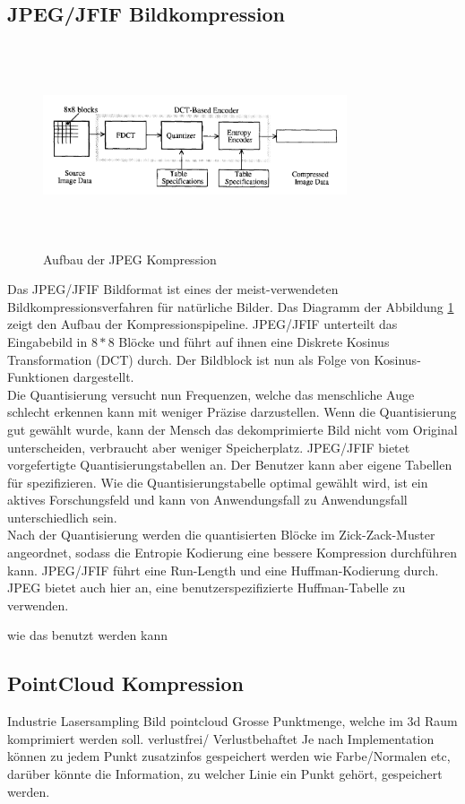 \subsection{JPEG/JFIF Bildkompression}
\begin{figure}[!htbp]
	\center
	\includegraphics[width=0.8\textwidth,height=6cm,keepaspectratio]{./pictures/state/jpeg.png}
	\caption{Aufbau der JPEG Kompression \cite{wallace1992jpeg}}
	\label{state:jpeg:abb}
\end{figure}
Das JPEG/JFIF Bildformat ist eines der meist-verwendeten Bildkompressionsverfahren für natürliche Bilder. Das Diagramm der Abbildung \ref{state:jpeg:abb} zeigt den Aufbau der Kompressionspipeline. JPEG/JFIF unterteilt das Eingabebild in $8*8$ Blöcke und führt auf ihnen eine Diskrete Kosinus Transformation (DCT) durch. Der Bildblock ist nun als Folge von Kosinus-Funktionen dargestellt.\\
Die Quantisierung versucht nun Frequenzen, welche das menschliche Auge schlecht erkennen kann mit weniger Präzise darzustellen. Wenn die Quantisierung gut gewählt wurde, kann der Mensch das dekomprimierte Bild nicht vom Original unterscheiden, verbraucht aber weniger Speicherplatz. JPEG/JFIF bietet vorgefertigte Quantisierungstabellen an. Der Benutzer kann aber eigene Tabellen für spezifizieren. Wie die Quantisierungstabelle optimal gewählt wird, ist ein aktives Forschungsfeld \cite{wu1993rate:jpeg} \cite{wang2001designing:jpeg} und kann von Anwendungsfall zu Anwendungsfall unterschiedlich sein.\\
Nach der Quantisierung werden die quantisierten Blöcke im Zick-Zack-Muster angeordnet, sodass die Entropie Kodierung eine bessere Kompression durchführen kann. JPEG/JFIF führt eine Run-Length und eine Huffman-Kodierung durch. JPEG bietet auch hier an, eine benutzerspezifizierte Huffman-Tabelle zu verwenden.

wie das benutzt werden kann

\subsection{PointCloud Kompression}
Industrie Lasersampling
Bild pointcloud \cite{merry2006compression:pointcloud}
Grosse Punktmenge, welche im 3d Raum komprimiert werden soll.
verlustfrei/ Verlustbehaftet
Je nach Implementation können zu jedem Punkt zusatzinfos gespeichert werden wie Farbe/Normalen etc, darüber könnte die Information, zu welcher Linie ein Punkt gehört, gespeichert werden.

